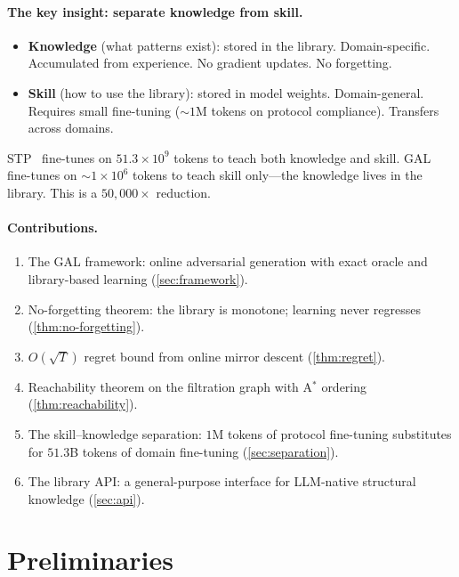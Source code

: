 \documentclass{article}
\begin{document}
\paragraph{The key insight: separate knowledge from skill.}
\begin{itemize}[nosep]
  \item \textbf{Knowledge} (what patterns exist):
    stored in the library.  Domain-specific.  Accumulated from
    experience.  No gradient updates.  No forgetting.
  \item \textbf{Skill} (how to use the library):
    stored in model weights.  Domain-general.  Requires small
    fine-tuning ($\sim\!1$M tokens on protocol compliance).
    Transfers across domains.
\end{itemize}
STP~\citep{dong2025stp} fine-tunes on $51.3 \times 10^9$ tokens
to teach both knowledge and skill.  GAL fine-tunes on
$\sim\!1 \times 10^6$ tokens to teach skill only---the knowledge
lives in the library.  This is a $50{,}000\times$ reduction.

\paragraph{Contributions.}
\begin{enumerate}[label=\textbf{C\arabic*},nosep]
  \item The GAL framework: online adversarial generation with
    exact oracle and library-based learning
    (\cref{sec:framework}).
  \item No-forgetting theorem: the library is monotone; learning
    never regresses (\cref{thm:no-forgetting}).
  \item $O(\sqrt{T})$ regret bound from online mirror descent
    (\cref{thm:regret}).
  \item Reachability theorem on the filtration graph with
    A$^*$ ordering (\cref{thm:reachability}).
  \item The skill--knowledge separation: $1$M tokens of protocol
    fine-tuning substitutes for $51.3$B tokens of domain
    fine-tuning (\cref{sec:separation}).
  \item The library API: a general-purpose interface for
    LLM-native structural knowledge (\cref{sec:api}).
\end{enumerate}

\section{Preliminaries}\label{sec:prelim}
\end{document}
